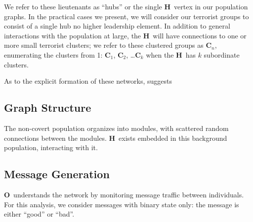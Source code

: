 \documentclass{article}
\newcommand{\Hub}[0]{\ensuremath{\mathbf{H}}}
\newcommand{\C}[1]{\ensuremath{\mathbf{C}_{#1}}}
\newcommand{\Obs}[0]{\ensuremath{\mathbf{O}}}
\begin{document}

We refer to these lieutenants as ``hubs'' or the single \Hub\ vertex in our population graphs.  In the practical cases we present, we will consider our terrorist groups to consist of a single hub no higher leadership element.  In addition to general interactions with the population at large, the \Hub\ will have connections to one or more small terrorist clusters; we refer to these clustered groups as \C{n}, enumerating the clusters from 1: \C{1}, \C{2}, \ldots \C{k} when the \Hub\ has $k$ subordinate clusters.

As to the explicit formation of these networks, \cite{sageman} suggests

\subsection*{Graph Structure}

The non-covert population organizes into modules, with scattered random connections between the modules.  \Hub\ exists embedded in this background population, interacting with it.

\subsection*{Message Generation}
\Obs\ understands the network by monitoring message traffic between individuals.  For this analysis, we consider messages with binary state only: the message is either ``good'' or ``bad''.
\end{document}
